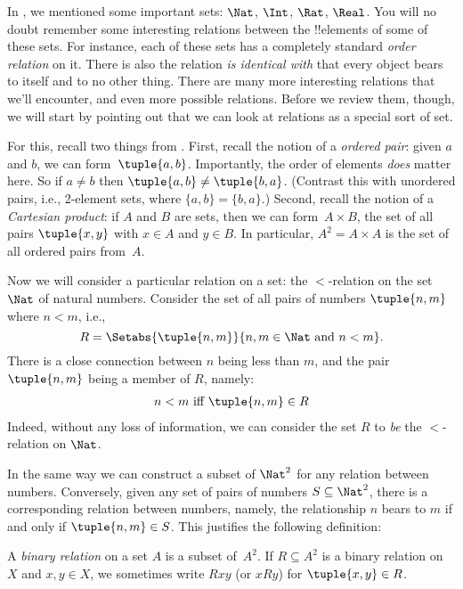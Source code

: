 \documentclass[../../../include/open-logic-section]{subfiles}
\begin{document}

\begin{explain}
In , we mentioned some important sets: $\Nat$, $\Int$, $\Rat$, $\Real$. You will no doubt remember some interesting relations between the !!{element}s of some of these sets. For instance, each of these sets has a completely standard \emph{order relation} on it.  There is also the relation \emph{is identical with} that every object bears to itself and to no other
thing. There are many more interesting relations that we'll
encounter, and even more possible relations. Before we review them, though, we will start by pointing out that we can look at relations as a special sort
of set. 

For this, recall two things  from . First, recall the notion of a \emph{ordered pair}: given $a$ and $b$, we can form~$\tuple{a, b}$. Importantly, the order
of elements \emph{does} matter here. So if $a \neq b$ then $\tuple{a, b} \neq \tuple{b, a}$. (Contrast this with unordered pairs, i.e., 2-element sets, where $\{a, b\}=\{b, a\}$.) Second, recall the notion of a \emph{Cartesian product}: if $A$ and $B$ are sets, then we can form~$A \times B$, the set of all pairs $\tuple{x, y}$ with $x \in A$ and
$y \in B$. In particular, $A^{2}= A \times A$ is the set of all ordered pairs
from~$A$.

Now we will consider a particular relation on a set: the $<$-relation on the set
$\Nat$ of natural numbers. Consider the set of all pairs of
numbers $\tuple{n, m}$ where $n<m$, i.e.,
\[
R=\Setabs{\tuple{n, m}}{n, m \in \Nat \text{ and } n<m}.
\]
There is a close connection between $n$ being less than $m$, and the pair $\tuple{n, m}$
being a member of $R$, namely:
\begin{align*}
		n<m\text{ iff }\tuple{n, m} \in R
\end{align*}
Indeed, without any loss of information, we can consider the set $R$ to \emph{be} the
$<$-relation on $\Nat$. 

In the same way we can construct
a subset of $\Nat^{2}$ for any relation between
numbers. Conversely, given any set of pairs of numbers
$S\subseteq\Nat^{2}$, there is a corresponding relation between
numbers, namely, the relationship $n$ bears to $m$ if and only if
$\tuple{n, m} \in S$. This justifies the following definition:
\end{explain}

\begin{defn}
A \emph{binary relation} on a set $A$ is a subset of~$A^{2}$. If
$R \subseteq A^{2}$ is a binary relation on~$X$ and $x, y \in X$,
we sometimes write $Rxy$ (or $xRy$) for $\tuple{x, y} \in R$.
\end{defn}
\end{document}
